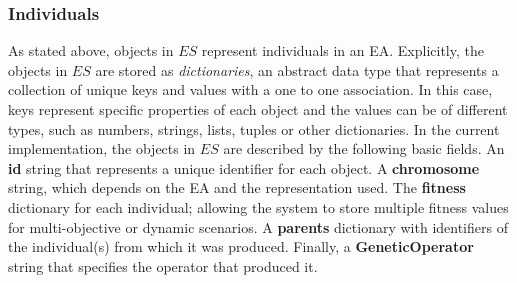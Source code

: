 \subsubsection{Individuals}
As stated above, objects in $ES$ represent individuals in an EA.
Explicitly, the objects in $ES$ are stored as \emph{dictionaries}, an abstract data type that represents a collection
of unique keys and values with a one to one association.
In this case, keys represent specific properties of each object and the values can be of different types, such as
numbers, strings, lists, tuples or other dictionaries.
In the current implementation, the objects in $ES$ are described by the following basic fields.
An \textbf{id} string that represents a unique identifier for each object.
A \textbf{chromosome} string, which depends on the EA and the representation used.
The \textbf{fitness} dictionary for each individual; allowing the system to store multiple fitness values for multi-objective or dynamic scenarios.
A \textbf{parents} dictionary with identifiers of the individual(s) from which it was produced.
Finally, a \textbf{GeneticOperator}  string that specifies the operator that produced it.


